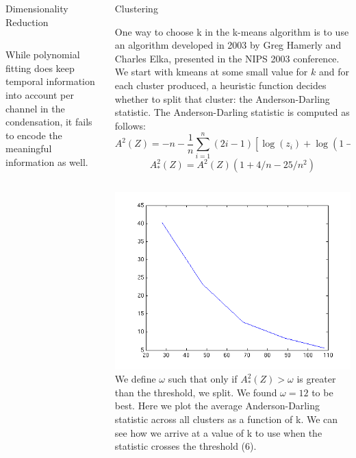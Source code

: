 \documentclass[final,t]{beamer}
\begin{document}
\begin{frame}{}
\begin{columns}[t]
\begin{column}{.3\linewidth}
\begin{block}{Dimensionality Reduction}
\begin{columns}[c]
     \end{columns}
     While polynomial fitting \alert{does keep temporal information} into
     account per channel in the condensation, it \alert{fails to encode the
     meaningful information as well}.

     \end{block}
   \end{column}
   
    
    \begin{column}{.3\linewidth}
      \begin{block}{Clustering}
        \par
        One way to choose k in the k-means algorithm is to use an algorithm
developed in 2003 by Greg Hamerly and Charles Elka, presented in the NIPS
2003 conference. We start with kmeans at some small value for $k$ and for each cluster produced, a
\alert{heuristic function decides whether to split that cluster}: the
Anderson-Darling statistic. The Anderson-Darling statistic is computed as follows:
$$
A^2(Z) = -n - \frac{1}{n}\sum_{i=1}^n (2i -
1)[\log(z_i)+\log(1-z_{n+1-i})]
$$$$
A^2_*(Z) = A^2(Z)(1 + 4/n - 25/n^2)
$$
\vskip2cm
       \begin{columns}[c,l]
\includegraphics[width=1.0\linewidth]{images/gmeans_k_vs_metric.png} 
We define $\omega$ such that only if $A^2_*(Z)  > \omega$ is
greater than the threshold, we split. We found $\omega = 12$ to be best.
Here we plot the average Anderson-Darling statistic across all
clusters as a function of k. We can see how we arrive at a value of k
to use when the statistic crosses the threshold (6).
       \end{columns} 


\end{block}
\end{column}
\end{columns}
\end{frame}
\end{document}

